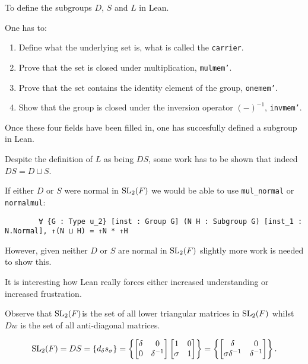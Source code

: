 \begin{remark}
    To define the subgroups $D$, $S$ and $L$ in Lean. 
    
    One has to:
    
    \begin{enumerate}
        \item Define what the underlying set is, what is called the \texttt{carrier}.
        \item Prove that the set is closed under multiplication, \texttt{mul\textunderscore mem'}.
        \item Prove that the set contains the identity element of the group, \texttt{one\textunderscore mem'}.
        \item Show that the group is closed under the inversion operator $(-)^{-1}$, \texttt{inv\textunderscore mem'}.
    \end{enumerate}

    Once these four fields have been filled in, one has succesfully defined a subgroup in Lean.
\end{remark}


\begin{remark}
    Despite the definition of $L$ as being $D S$, some work has to be shown that indeed $DS = D \sqcup S$.
    
    If either $D$ or $S$ were normal in $\operatorname{SL}_2(F)$ we would be able to use \texttt{mul_normal} or \texttt{normal\textunderscore mul}:
    
    \begin{verbatim}
        ∀ {G : Type u_2} [inst : Group G] (N H : Subgroup G) [inst_1 : N.Normal], ↑(N ⊔ H) = ↑N * ↑H
    \end{verbatim}

    However, given neither $D$ or $S$ are normal in $\operatorname{SL}_2(F)$ slightly more work is needed to show this.
    
    It is interesting how Lean really forces either increased understanding or increased frustration.
\end{remark}

Observe that $\operatorname{SL}_2(F)$is the set of all lower triangular matrices in $\operatorname{SL}_2(F)$ whilst $Dw$ is the set of all anti-diagonal matrices.

\begin{equation} \label{Hlowertri} \operatorname{SL}_2(F)= DS =  \{d_\delta s_\sigma\} = \left\{ \begin{bmatrix} \delta & 0 \\ 0 & \delta^{-1} \end{bmatrix} \begin{bmatrix} 1 & 0 \\ \sigma & 1 \end{bmatrix} \right\} = \left\{ \begin{bmatrix} \delta & 0 \\ \sigma \delta^{-1} & \delta^{-1} \end{bmatrix}  \right\}. \end{equation}

